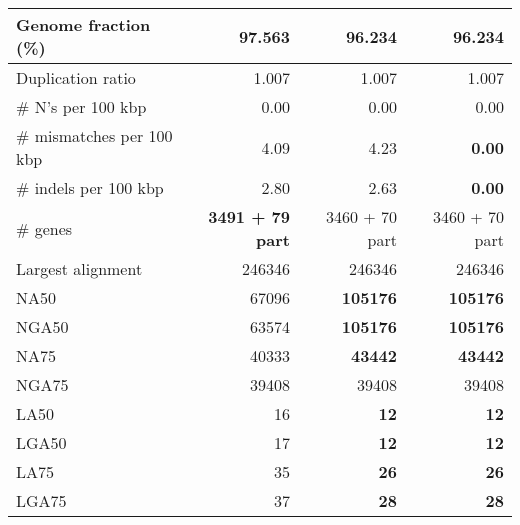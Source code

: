 \documentclass[12pt,a4paper]{article}
\begin{document}
\begin{table}[ht]
\begin{center}
\begin{tabular}{|l*{3}{|r}|}
Genome fraction (\%) & {\bf 97.563} & 96.234 & 96.234 \\ \hline
Duplication ratio & 1.007 & 1.007 & 1.007 \\ \hline
\# N's per 100 kbp & 0.00 & 0.00 & 0.00 \\ \hline
\# mismatches per 100 kbp & 4.09 & 4.23 & {\bf 0.00} \\ \hline
\# indels per 100 kbp & 2.80 & 2.63 & {\bf 0.00} \\ \hline
\# genes & {\bf 3491 + 79 part} & 3460 + 70 part & 3460 + 70 part \\ \hline
Largest alignment & 246346 & 246346 & 246346 \\ \hline
NA50 & 67096 & {\bf 105176} & {\bf 105176} \\ \hline
NGA50 & 63574 & {\bf 105176} & {\bf 105176} \\ \hline
NA75 & 40333 & {\bf 43442} & {\bf 43442} \\ \hline
NGA75 & 39408 & 39408 & 39408 \\ \hline
LA50 & 16 & {\bf 12} & {\bf 12} \\ \hline
LGA50 & 17 & {\bf 12} & {\bf 12} \\ \hline
LA75 & 35 & {\bf 26} & {\bf 26} \\ \hline
LGA75 & 37 & {\bf 28} & {\bf 28} \\ \hline
\end{tabular}
\end{center}
\end{table}
\end{document}
